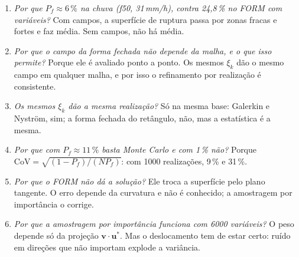 \begin{enumerate}[label=\textbf{P\arabic*.}, leftmargin=2.2em]
    limitada por $k$. Com $k > I$, a água entra toda, mas drena rápido.
  \item \emph{Por que $P_f \approx 6\,\%$ na chuva (f50, 31\,mm/h), contra 24,8\,\% no FORM com variáveis?} Com campos, a superfície de
    ruptura passa por zonas fracas e fortes e faz média. Sem campos, não há média.
  \item \emph{Por que o campo da forma fechada não depende da malha, e o que isso permite?} Porque ele é avaliado ponto
    a ponto. Os mesmos $\xi_k$ dão o mesmo campo em qualquer malha, e por isso o refinamento por realização é
    consistente.
  \item \emph{Os mesmos $\xi_k$ dão a mesma realização?} Só na mesma base: Galerkin e Nyström, sim; a forma fechada do
    retângulo, não, mas a estatística é a mesma.
  \item \emph{Por que com $P_f \approx 11\,\%$ basta Monte Carlo e com 1\,\% não?} Porque
    $\mathrm{CoV} = \sqrt{(1 - P_f)/(NP_f)}$: com 1000 realizações, 9\,\% e 31\,\%.
  \item \emph{Por que o FORM não dá a solução?} Ele troca a superfície pelo plano tangente. O erro depende da curvatura
    e não é conhecido; a amostragem por importância o corrige.
  \item \emph{Por que a amostragem por importância funciona com 6000 variáveis?} O peso depende só da projeção
    $\bm v\cdot\bm u^*$. Mas o deslocamento tem de estar certo: ruído em direções que não importam explode a variância.
\end{enumerate}
